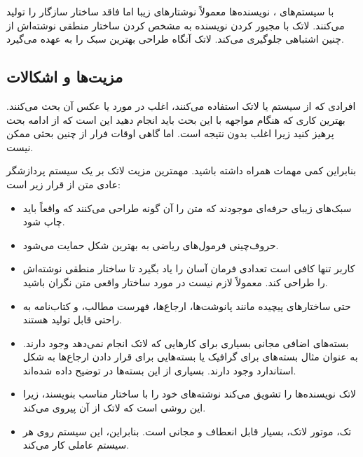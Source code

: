 با سیستم‌های 
، 
نویسنده‌ها معمولاً نوشتارهای زیبا اما فاقد ساختار سازگار را تولید می‌کنند. لاتک با مجبور کردن نویسنده به مشخص کردن ساختار منطقی نوشته‌اش از چنین اشتباهی جلوگیری می‌کند. لاتک آنگاه طراحی بهترین سبک‌ را به عهده می‌گیرد.
\subsection{مزیت‌ها و اشکالات}

افرادی که از سیستم 
یا لاتک استفاده می‌کنند، اغلب در مورد   
یا عکس آن بحث می‌کنند. بهترین کاری که هنگام مواجهه با این بحث باید انجام دهید این است که از ادامه بحث پرهیز کنید زیرا اغلب بدون نتیجه است. 
اما گاهی اوقات فرار از چنین بحثی ممکن نیست.

\medskip\noindent 
بنابراین کمی مهمات همراه داشته باشید. مهمترین مزیت لاتک بر یک سیستم پردازشگر عادی متن از قرار زیر است:

\begin{itemize}

\item 
سبک‌‌های زیبای حرفه‌ای موجودند که متن را آن گونه طراحی می‌کنند که واقعاً باید چاپ شود.
\item 
حروف‌چینی فرمول‌های ریاضی به بهترین شکل حمایت می‌شود.
\item 
کاربر تنها کافی است تعدادی فرمان آسان را یاد بگیرد تا ساختار منطقی نوشته‌اش را طراحی کند. معمولاً لازم نیست در مورد ساختار واقعی متن
 نگران باشید.
\item 
حتی ساختارهای پیچیده مانند پانوشت‌ها، ارجاع‌ها، فهرست مطالب، و کتاب‌نامه به راحتی قابل تولید هستند.
\item 
بسته‌های اضافی مجانی بسیاری برای کارهایی که لاتک انجام نمی‌دهد وجود دارند. به عنوان مثال بسته‌های  \PSi برای گرافیک یا 
بسته‌هایی برای قرار دادن ارجاع‌ها به شکل استاندارد وجود دارند. بسیاری از این بسته‌ها در \companion توضیح داده شده‌اند.
\item 
لاتک نویسنده‌ها را تشویق می‌کند نوشته‌های خود را با ساختار مناسب بنویسند، زیرا این روشی است که لاتک از آن پیروی می‌کند.
\item 
تک، موتور لاتک، بسیار قابل انعطاف و مجانی است. بنابراین، این سیستم روی هر سیستم‌ عاملی کار می‌کند. 
%
%
\end{itemize}


